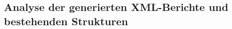 \subsection{Analyse der generierten XML-Berichte und bestehenden Strukturen}
\label{subsec:analyse-der-generierten-xml-berichte-und-bestehenden-strukturen}


